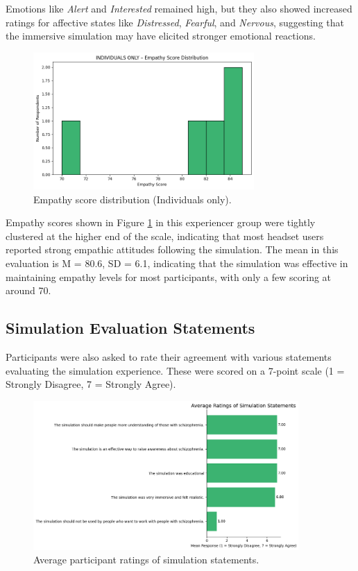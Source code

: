 Emotions like \textit{Alert} and \textit{Interested} remained high, but they also showed increased ratings for affective states like \textit{Distressed}, \textit{Fearful}, and \textit{Nervous}, suggesting that the immersive simulation may have elicited stronger emotional reactions.

\begin{figure}[htbp]
    \centering
    \includegraphics[width=0.75\textwidth]{../../Figures/empathy-score-post-indiv.png}
    \caption{Empathy score distribution (Individuals only).}
    \label{fig:empathy_indiv_post}
\end{figure}

\vspace{1em}

Empathy scores shown in Figure \ref{fig:empathy_indiv_post} in this experiencer group were tightly clustered at the higher end of the scale, indicating that most headset users reported strong empathic attitudes following the simulation. The mean in this evaluation is M = 80.6, SD = 6.1, indicating that the simulation was effective in maintaining empathy levels for most participants, with only a few scoring at around 70.

\subsection{Simulation Evaluation Statements}

Participants were also asked to rate their agreement with various statements evaluating the simulation experience. These were scored on a 7-point scale (1 = Strongly Disagree, 7 = Strongly Agree).

\begin{figure}[H]
    \centering
    \includegraphics[width=0.9\textwidth]{../../Figures/simulation-evaluation-post.png}
    \caption{Average participant ratings of simulation statements.}
    \label{fig:simulation_evaluation_post}
\end{figure}


